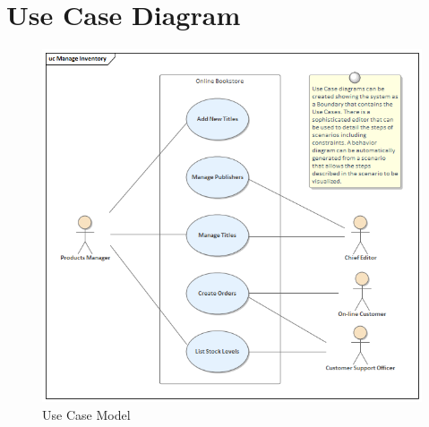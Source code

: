\documentclass[english,12pt,a4paper]{report}
\begin{document}
	\section{Use Case Diagram}
	\begin{figure}[h]
		\centering
		\includegraphics[width=1\textwidth]{usecase.png} 
		\caption{Use Case Model}
		\label{fig:Use Case Model}
	\end{figure}
	
\end{document}
